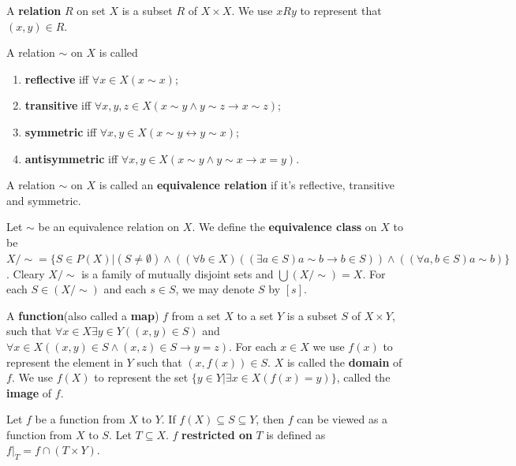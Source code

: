 \documentclass[12pt]{book}
\begin{document}
\begin{definition}
	A {\bf relation} $R$ on set $X$ is a subset $R$ of $X\times X$. We use $x R y$ to represent that $(x,y)\in R$. 
\end{definition}
\begin{definition}
	A relation $\sim$ on $X$ is called
	\begin{enumerate}
		\item {\bf reflective} iff $\forall x\in X(x\sim x)$;
		\item {\bf transitive} iff $\forall x,y,z\in X(x\sim y\wedge y\sim z\rightarrow x\sim z)$;
		\item {\bf symmetric} iff $\forall x,y\in X(x\sim y\leftrightarrow y\sim x)$;
		\item {\bf antisymmetric} iff $\forall x,y\in X(x\sim y\wedge y\sim x\rightarrow x=y)$.
	\end{enumerate}
\end{definition}
\begin{definition}
	A relation $\sim$ on $X$ is called an {\bf equivalence relation} if it's reflective, transitive and symmetric.
\end{definition}
\begin{definition}
	Let $\sim$ be an equivalence relation on $X$. We define the {\bf equivalence class} on $X$ to be $X/\sim=\{S\in P(X)|(S\neq\emptyset)\wedge((\forall b\in X) ( (\exists a\in S)a\sim b\rightarrow b\in S))\wedge ((\forall a,b\in S)a\sim b)\}$. Cleary $X/\sim$ is a family of mutually disjoint sets and $\bigcup(X/\sim)=X$. For each $S\in (X/\sim)$ and each $s\in S$, we may denote $S$ by $[s]$. 
\end{definition}
\begin{definition}
	A {\bf function}(also called a {\bf map}) $f$ from a set $X$ to a set $Y$ is a subset $S$ of $X\times Y$, such that $\forall x\in X\exists y\in Y((x,y)\in S)$ and $\forall x\in X((x,y)\in S\wedge(x,z)\in S\rightarrow y=z)$. For each $x\in X$ we use $f(x)$ to represent the element in $Y$ such that $(x,f(x))\in S$. $X$ is called the {\bf domain} of $f$. We use $f(X)$ to represent the set $\{y\in Y|\exists x\in X(f(x)=y)\}$, called the {\bf image} of $f$.
\end{definition}

\begin{definition}
	Let $f$ be a function from $X$ to $Y$. If $f(X)\subseteq S\subseteq Y$, then $f$ can be viewed as a function from $X$ to $S$. Let $T\subseteq X$. $f$ {\bf restricted on} $T$ is defined as $f|_T=f\cap(T\times Y)$.
\end{definition}
\end{document}
